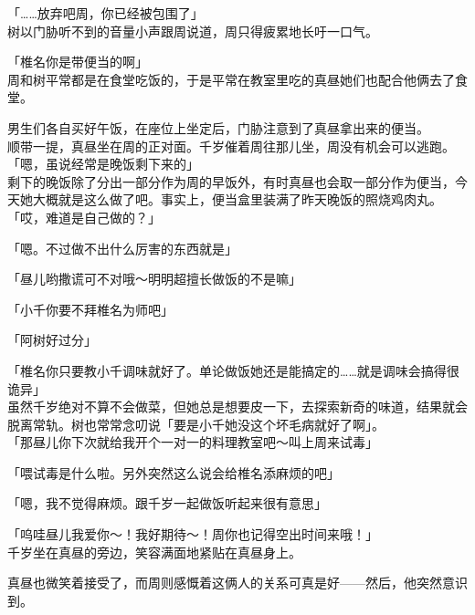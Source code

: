 「……放弃吧周，你已经被包围了」\\

树以门胁听不到的音量小声跟周说道，周只得疲累地长吁一口气。\\

\vspace{2\baselineskip}

「椎名你是带便当的啊」\\

周和树平常都是在食堂吃饭的，于是平常在教室里吃的真昼她们也配合他俩去了食堂。

男生们各自买好午饭，在座位上坐定后，门胁注意到了真昼拿出来的便当。\\

顺带一提，真昼坐在周的正对面。千岁催着周往那儿坐，周没有机会可以逃跑。\\

「嗯，虽说经常是晚饭剩下来的」\\

剩下的晚饭除了分出一部分作为周的早饭外，有时真昼也会取一部分作为便当，今天她大概就是这么做了吧。事实上，便当盒里装满了昨天晚饭的照烧鸡肉丸。\\

「哎，难道是自己做的？」

「嗯。不过做不出什么厉害的东西就是」

「昼儿哟撒谎可不对哦～明明超擅长做饭的不是嘛」

「小千你要不拜椎名为师吧」

「阿树好过分」

「椎名你只要教小千调味就好了。单论做饭她还是能搞定的……就是调味会搞得很诡异」\\

虽然千岁绝对不算不会做菜，但她总是想要皮一下，去探索新奇的味道，结果就会脱离常轨。树也常常念叨说「要是小千她没这个坏毛病就好了啊」。\\

「那昼儿你下次就给我开个一对一的料理教室吧～叫上周来试毒」

「喂试毒是什么啦。另外突然这么说会给椎名添麻烦的吧」

「嗯，我不觉得麻烦。跟千岁一起做饭听起来很有意思」

「呜哇昼儿我爱你～！我好期待～！周你也记得空出时间来哦！」\\

千岁坐在真昼的旁边，笑容满面地紧贴在真昼身上。

真昼也微笑着接受了，而周则感慨着这俩人的关系可真是好——然后，他突然意识到。\\

